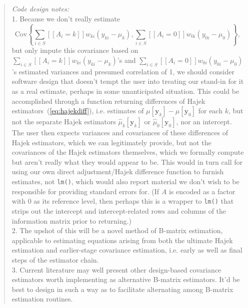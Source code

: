 \begin{quote}
\textit{Code design notes:}\\
1. Because we don't really estimate
\begin{equation*}
  \mathrm{Cov}\left\{
\sum_{i\in S} [\![A_i=k]\!] w_{ki} (y_{ki} - \mu_k),
\sum_{i\in S} [\![A_i=0]\!] w_{0i} (y_{0i} - \mu_0)
\right\},
\end{equation*}
but only impute this covariance based on
$\sum_{i\in S} [\![A_i=k]\!] w_{ki} (y_{ki} - \mu_k)$'s and
$\sum_{i\in S} [\![A_i=0]\!] w_{0i} (y_{0i} - \mu_0)$'s estimated
variances and presumed correlation of 1, we should consider software design that doesn't tempt the user into
treating our stand-in for it as a real estimate, perhaps in some
unanticipated situation.  This could be accomplished through a
function returning differences of Hajek
estimators~(\ref{eq:hajekdiff}), i.e. estimates of $\mu[\mathbf{y}_{k}] -
\mu[\mathbf{y}_{0}]$ for each $k$, but not the separate Hajek estimators
$\hat{\mu}_{k}[\mathbf{y}_{k}]$ or $\hat{\mu}_{0}[\mathbf{y}_{0}]$, nor an
intercept. The user then expects variances and covariances of these
differences of Hajek estimators, which we can legitimately provide,
but not the covariances of the Hajek estimators themselves, which we
formally compute but aren't really what they would appear to be.  This
would in turn call for using our own direct adjustment/Hajek
difference function to furnish estimates, not \texttt{lm()}, which
would also report material we don't wish to be responsible for
providing standard errors for.  (If $A$ is encoded as a factor with 0
as its reference level, then perhaps this is a wrapper to
\texttt{lm()} that strips out the intercept and intercept-related rows
and columns of the information matrix prior to returning.)\\
2. The upshot of this will be a novel method of B-matrix estimation,
applicable to estimating equations arising from both the ultimate
Hajek estimation and earlier-stage covariance estimation, i.e. early as well as final
steps of the estimator chain.\\
3. Current literature \citet[e.g.,][\ldots]{mukerjeeDasguptaRubin18,pashleymiratrix18varestimationblockeddesigns} may well present other design-based covariance
estimators worth implementing as alternative B-matrix estimators.
It'd be best to design in such a way as to facilitate alternating
among B-matrix estimation routines.
\end{quote}

